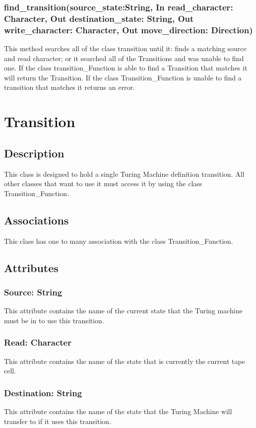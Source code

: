 \documentclass{report}
\begin{document}
      \subsubsection{find\_transition(source\_state:String, In read\_character: Character, Out destination\_state: String, Out write\_character: Character, Out move\_direction: Direction)}
      This method searches all of the class transition until it: finds a matching source and read character; or it searched all of the Transitions and was unable to find one. If the class transition\_Function is able to find a Transition that matches it will return the Transition. If the class Transition\_Function is unable to find a transition that matches it returns an error.
    
    
      \section{Transition}
	\subsection{Description}
    This class is designed to hold a single Turing Machine definition transition. All other classes that want to use it must access it by using the class Transition\_Function.
    
    \subsection{Associations} 
     This class has one to many association with the class Transition\_Function.  
    \subsection{Attributes} 

	\subsubsection{Source: String}
    This attribute contains the name of the current state that the Turing machine must be in to use this transition.
    \subsubsection{Read: Character}
    This attribute contains the name of the state that is currently the current tape cell.
    \subsubsection{Destination: String}
    This attribute contains the name of the state that the Turing Machine will transfer to if it uses this transition.
\end{document}
